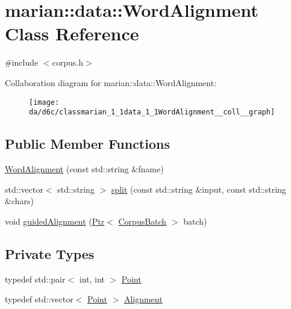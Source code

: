 \hypertarget{classmarian_1_1data_1_1WordAlignment}{}\section{marian\+:\+:data\+:\+:Word\+Alignment Class Reference}
\label{classmarian_1_1data_1_1WordAlignment}


{\ttfamily \#include $<$corpus.\+h$>$}



Collaboration diagram for marian\+:\+:data\+:\+:Word\+Alignment\+:
\nopagebreak
\begin{figure}[H]
\begin{center}
\leavevmode
\texttt{[image: da/d6c/classmarian\_1\_1data\_1\_1WordAlignment\_\_coll\_\_graph]}
\end{center}
\end{figure}
\subsection*{Public Member Functions}
\begin{DoxyCompactItemize}
\item 
\hyperlink{classmarian_1_1data_1_1WordAlignment_abfedf789cab3e70b085e977d8638f2dc}{Word\+Alignment} (const std\+::string \&fname)
\item 
std\+::vector$<$ std\+::string $>$ \hyperlink{classmarian_1_1data_1_1WordAlignment_a9bd45b6d1d88ebacef9fbd40b9a36556}{split} (const std\+::string \&input, const std\+::string \&chars)
\item 
void \hyperlink{classmarian_1_1data_1_1WordAlignment_a30dc39303000417c226304523114c6f4}{guided\+Alignment} (\hyperlink{namespacemarian_ad1a373be43a00ef9ce35666145137b08}{Ptr}$<$ \hyperlink{classmarian_1_1data_1_1CorpusBatch}{Corpus\+Batch} $>$ batch)
\end{DoxyCompactItemize}
\subsection*{Private Types}
\begin{DoxyCompactItemize}
\item 
typedef std\+::pair$<$ int, int $>$ \hyperlink{classmarian_1_1data_1_1WordAlignment_aeb672afb1cec0627e27447d9afb50357}{Point}
\item 
typedef std\+::vector$<$ \hyperlink{classmarian_1_1data_1_1WordAlignment_aeb672afb1cec0627e27447d9afb50357}{Point} $>$ \hyperlink{classmarian_1_1data_1_1WordAlignment_a30535cd052cdd3d686d53917d8be5259}{Alignment}
\end{DoxyCompactItemize}
